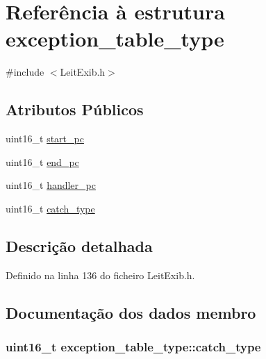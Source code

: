 \hypertarget{structexception__table__type}{\section{Referência à estrutura exception\-\_\-table\-\_\-type}
\label{structexception__table__type}
}


{\ttfamily \#include $<$Leit\-Exib.\-h$>$}

\subsection*{Atributos Públicos}
\begin{DoxyCompactItemize}
\item 
uint16\-\_\-t \hyperlink{structexception__table__type_a6d9707a45444960af306cacffc22d95c}{start\-\_\-pc}
\item 
uint16\-\_\-t \hyperlink{structexception__table__type_affc7a7c52ef9dd25b70496e374dde498}{end\-\_\-pc}
\item 
uint16\-\_\-t \hyperlink{structexception__table__type_a168dd215f7eea25beaf31316f15b48b7}{handler\-\_\-pc}
\item 
uint16\-\_\-t \hyperlink{structexception__table__type_a631f45ee5bb0ceef463253f7e3d50aca}{catch\-\_\-type}
\end{DoxyCompactItemize}


\subsection{Descrição detalhada}


Definido na linha 136 do ficheiro Leit\-Exib.\-h.



\subsection{Documentação dos dados membro}
\hypertarget{structexception__table__type_a631f45ee5bb0ceef463253f7e3d50aca}{
\subsubsection[{catch\-\_\-type}]{\setlength{\rightskip}{0pt plus 5cm}uint16\-\_\-t exception\-\_\-table\-\_\-type\-::catch\-\_\-type}}\label{structexception__table__type_a631f45ee5bb0ceef463253f7e3d50aca}



